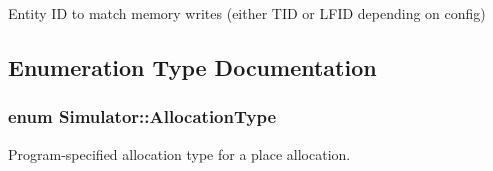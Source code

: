 Entity I\+D to match memory writes (either T\+I\+D or L\+F\+I\+D depending on config) 



\subsection{Enumeration Type Documentation}
\hypertarget{namespace_simulator_a5c7d556007e11ed2e93f9fe53c60128b}{
\subsubsection[{Allocation\+Type}]{\setlength{\rightskip}{0pt plus 5cm}enum {\bf Simulator\+::\+Allocation\+Type}}}\label{namespace_simulator_a5c7d556007e11ed2e93f9fe53c60128b}


Program-\/specified allocation type for a place allocation. 

